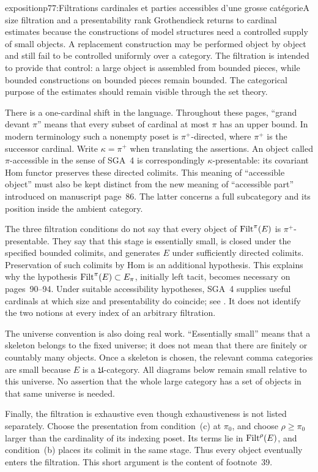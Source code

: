 \begin{dcomment}{exposition}{p77:Filtrations cardinales et parties accessibles d'une grosse catégorie}{A size filtration and a presentability rank}
Grothendieck returns to cardinal estimates because the constructions of model structures need a controlled supply of small objects. A replacement construction may be performed object by object and still fail to be controlled uniformly over a category. The filtration is intended to provide that control: a large object is assembled from bounded pieces, while bounded constructions on bounded pieces remain bounded. The categorical purpose of the estimates should remain visible through the set theory.

There is a one-cardinal shift in the language. Throughout these pages, ``grand devant $\pi$'' means that every subset of cardinal at most $\pi$ has an upper bound. In modern terminology such a nonempty poset is $\pi^+$-directed, where $\pi^+$ is the successor cardinal. Write $\kappa=\pi^+$ when translating the assertions. An object called $\pi$-accessible in the sense of SGA~4 is correspondingly $\kappa$-presentable: its covariant Hom functor preserves these directed colimits. This meaning of ``accessible object'' must also be kept distinct from the new meaning of ``accessible part'' introduced on manuscript page~86. The latter concerns a full subcategory and its position inside the ambient category.

The three filtration conditions do not say that every object of $\mathrm{Filt}^\pi(E)$ is $\pi^+$-presentable. They say that this stage is essentially small, is closed under the specified bounded colimits, and generates $E$ under sufficiently directed colimits. Preservation of such colimits by Hom is an additional hypothesis. This explains why the hypothesis $\mathrm{Filt}^\pi(E)\subset E_\pi$, initially left tacit, becomes necessary on pages~90--94. Under suitable accessibility hypotheses, SGA~4 supplies useful cardinals at which size and presentability do coincide; see \citet[I, 9.16--9.18]{SGA4I1972}. It does not identify the two notions at every index of an arbitrary filtration.

The universe convention is also doing real work. ``Essentially small'' means that a skeleton belongs to the fixed universe; it does not mean that there are finitely or countably many objects. Once a skeleton is chosen, the relevant comma categories are small because $E$ is a $\mathfrak U$-category. All diagrams below remain small relative to this universe. No assertion that the whole large category has a set of objects in that same universe is needed.

Finally, the filtration is exhaustive even though exhaustiveness is not listed separately. Choose the presentation from condition~(c) at $\pi_0$, and choose $\rho\geq\pi_0$ larger than the cardinality of its indexing poset. Its terms lie in $\mathrm{Filt}^\rho(E)$, and condition~(b) places its colimit in the same stage. Thus every object eventually enters the filtration. This short argument is the content of footnote~39.
\end{dcomment}


